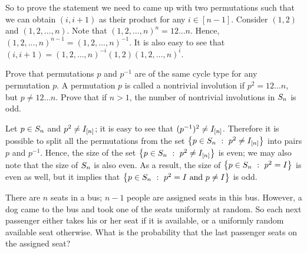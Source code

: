 \begin{chapterendexercises}
\begin{solution}
      So to prove the statement we need to came up with two permutations such
      that we can obtain $(i, i + 1)$ as their product for any $i \in [n - 1]$.
      Consider $(1, 2)$ and $(1, 2, \dots, n)$. Note that $(1, 2, \dots, n)^n =
      1 2 \dots n$. Hence, $(1, 2, \dots, n)^{n - 1} = (1, 2, \dots, n)^{-1}$.
      It is also easy to see that 
      $(i, i + 1) = (1, 2, \dots, n)^{-i} (1, 2) (1, 2, \dots, n)^i$.
    \end{solution}
  \exercise[recommended] Prove that permutations $p$ and $p^{-1}$ are of the
    same cycle type for any permutation $p$.
  \exercise[recommended] A permutation $p$ is called a nontrivial involution if
    $p^2 = 1 2 \dots n$, but $p \neq 1 2 \dots n$. Prove that if $n > 1$, the
    number of nontrivial involutions in $S_{n}$ is odd.
    \begin{solution}
      Let $p \in S_{n}$ and $p^2 \neq I_{{[{n}]}}$; it is easy to see
      that $(p^{-1})^2 \neq I_{{[{n}]}}$. Therefore it is possible to
      split all the permutations from the set
      $\set[p^2 \neq \identity{\range{n}}]{p \in \permutations{n}}$ into pairs $p$ and
      $p^{-1}$. Hence, the size of the set
      $\set[p^2 \neq \identity{\range{n}}]{p \in \permutations{n}}$ is even; we
      may also note that the size of $S_{n}$ is also even. As a
      result, the size of $\set[p^2 = I]{p \in \permutations{n}}$ is even as well, but it
      implies that $\set[{p^2 = I \text{ and } p \neq I}]{p \in
      \permutations{n}}$ is odd.
    \end{solution}
  \exercise There are $n$ seats in a bus; $n - 1$ people are assigned seats in
    this bus. However, a dog came to the bus and took one of the seats uniformly
    at random. So each next passenger either takes his or her seat if it is
    available, or a uniformly random available seat otherwise. What is the
    probability that the last passenger seats on the assigned seat?
\end{chapterendexercises}

